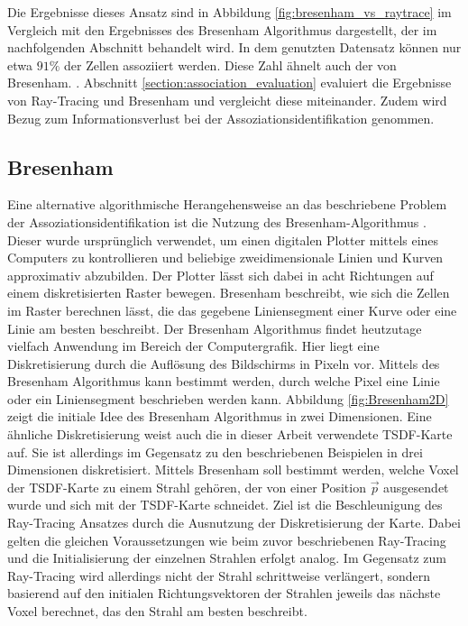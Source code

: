 Die Ergebnisse dieses Ansatz sind in Abbildung \ref{fig:bresenham_vs_raytrace} im Vergleich mit den Ergebnisses des Bresenham Algorithmus dargestellt, der im nachfolgenden Abschnitt behandelt wird. In dem genutzten Datensatz können nur etwa $91\%$ der Zellen assoziiert werden. Diese Zahl ähnelt auch der von Bresenham. . Abschnitt \ref{section:association_evaluation} evaluiert die Ergebnisse von Ray-Tracing und Bresenham und vergleicht diese miteinander. Zudem wird Bezug zum Informationsverlust bei der Assoziationsidentifikation genommen.

\subsection{Bresenham}

Eine alternative algorithmische Herangehensweise an das beschriebene Problem der Assoziationsidentifikation ist die Nutzung des Bresenham-Algorithmus \cite{bresenham1965algorithm}. Dieser wurde ursprünglich verwendet, um einen digitalen Plotter mittels eines Computers zu kontrollieren und beliebige zweidimensionale Linien und Kurven approximativ abzubilden. Der Plotter lässt sich dabei in acht Richtungen auf einem diskretisierten Raster bewegen. Bresenham \cite{bresenham1965algorithm} beschreibt, wie sich die Zellen im Raster berechnen lässt, die das gegebene Liniensegment einer Kurve oder eine Linie am besten beschreibt. Der Bresenham Algorithmus findet heutzutage vielfach Anwendung im Bereich der Computergrafik. Hier liegt eine Diskretisierung durch die Auflösung des Bildschirms in Pixeln vor. Mittels des Bresenham Algorithmus kann bestimmt werden, durch welche Pixel eine Linie oder ein Liniensegment beschrieben werden kann. Abbildung \ref{fig:Bresenham2D} zeigt die initiale Idee des Bresenham Algorithmus in zwei Dimensionen. Eine ähnliche Diskretisierung weist auch die in dieser Arbeit verwendete TSDF-Karte auf. Sie ist allerdings im Gegensatz zu den beschriebenen Beispielen in drei Dimensionen diskretisiert. Mittels Bresenham soll bestimmt werden, welche Voxel der TSDF-Karte zu einem Strahl gehören, der von einer Position $\vec{p}$ ausgesendet wurde und sich mit der TSDF-Karte schneidet. Ziel ist die Beschleunigung des Ray-Tracing Ansatzes durch die Ausnutzung der Diskretisierung der Karte. Dabei gelten die gleichen Voraussetzungen wie beim zuvor beschriebenen Ray-Tracing und die Initialisierung der einzelnen Strahlen erfolgt analog. Im Gegensatz zum Ray-Tracing wird allerdings nicht der Strahl schrittweise verlängert, sondern basierend auf den initialen Richtungsvektoren der Strahlen jeweils das nächste Voxel berechnet, das den Strahl am besten beschreibt.

